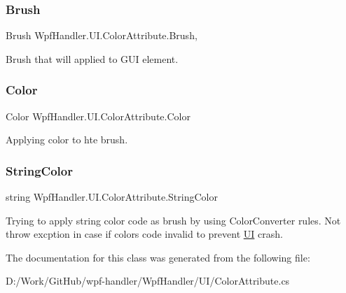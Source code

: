 \subsubsection{\texorpdfstring{Brush}{Brush}}
{\footnotesize\ttfamily Brush Wpf\+Handler.\+U\+I.\+Color\+Attribute.\+Brush\hspace{0.3cm}{\ttfamily [get]}, {\ttfamily [set]}}



Brush that will applied to G\+UI element. 

\mbox{\label{class_wpf_handler_1_1_u_i_1_1_color_attribute_a6c5c2202427bd48877142ecf85327843}} 
\subsubsection{\texorpdfstring{Color}{Color}}
{\footnotesize\ttfamily Color Wpf\+Handler.\+U\+I.\+Color\+Attribute.\+Color\hspace{0.3cm}{\ttfamily [set]}}



Applying color to hte brush. 

\mbox{\label{class_wpf_handler_1_1_u_i_1_1_color_attribute_a2f09d55a6dfaf3912f2941910e1936e8}} 
\subsubsection{\texorpdfstring{String\+Color}{StringColor}}
{\footnotesize\ttfamily string Wpf\+Handler.\+U\+I.\+Color\+Attribute.\+String\+Color\hspace{0.3cm}{\ttfamily [set]}}



Trying to apply string color code as brush by using Color\+Converter rules. Not throw excption in case if color\textquotesingle{}s code invalid to prevent \mbox{\hyperlink{namespace_wpf_handler_1_1_u_i}{UI}} crash. 



The documentation for this class was generated from the following file\+:\begin{DoxyCompactItemize}
\item 
D\+:/\+Work/\+Git\+Hub/wpf-\/handler/\+Wpf\+Handler/\+U\+I/Color\+Attribute.\+cs\end{DoxyCompactItemize}
